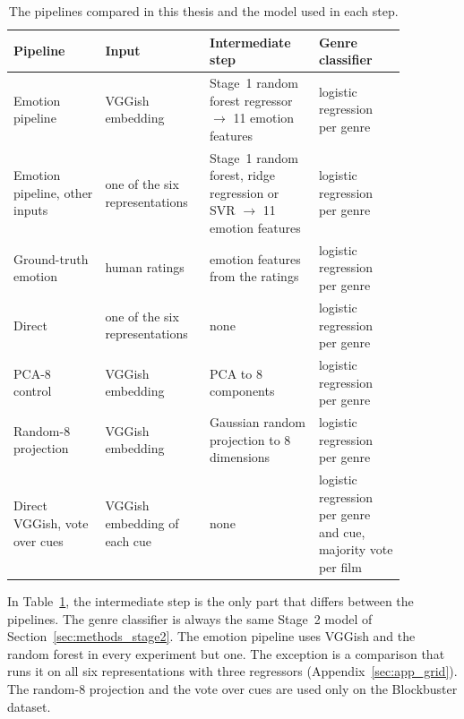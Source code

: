 \begin{table}[H]
  \centering
  \small
  \caption{The pipelines compared in this thesis and the model used in each step.}
  \label{tab:pipelines}
  \begin{tabular}{>{\raggedright\arraybackslash}p{0.21\linewidth}>{\raggedright\arraybackslash}p{0.21\linewidth}>{\raggedright\arraybackslash}p{0.25\linewidth}>{\raggedright\arraybackslash}p{0.2\linewidth}}
    \toprule
    Pipeline & Input & Intermediate step & Genre classifier \\
    \midrule
    Emotion pipeline & VGGish embedding & Stage~1 random forest regressor $\rightarrow$ 11 emotion features & logistic regression per genre \\
    Emotion pipeline, other inputs & one of the six representations & Stage~1 random forest, ridge regression or SVR $\rightarrow$ 11 emotion features & logistic regression per genre \\
    Ground-truth emotion & human ratings & 11 emotion features from the ratings & logistic regression per genre \\
    Direct & one of the six representations & none & logistic regression per genre \\
    PCA-8 control & VGGish embedding & PCA to 8 components & logistic regression per genre \\
    Random-8 projection & VGGish embedding & Gaussian random projection to 8 dimensions & logistic regression per genre \\
    Direct VGGish, vote over cues & VGGish embedding of each cue & none & logistic regression per genre and cue, majority vote per film \\
    \bottomrule
  \end{tabular}
\end{table}

In Table~\ref{tab:pipelines}, the intermediate step is the only part that differs between the pipelines. The genre classifier is always the same Stage~2 model of Section~\ref{sec:methods_stage2}. The emotion pipeline uses VGGish and the random forest in every experiment but one. The exception is a comparison that runs it on all six representations with three regressors (Appendix~\ref{sec:app_grid}). The random-8 projection and the vote over cues are used only on the Blockbuster dataset.

